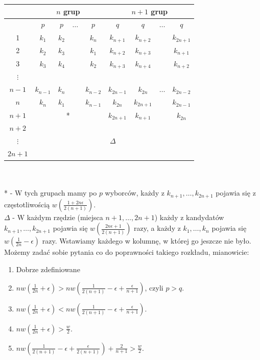 \documentclass[12pt,a4paper]{article}
\theoremstyle{break}
\begin{document}
	\begin{tabular}{|c|cccc|cccc|}\hline
		&\multicolumn{4}{c|}{$n$ grup}&\multicolumn{4}{c|}{$n+1$ grup}\\\hline
		&$p$&$p$&$\dots$&$p$&$q$&$q$&$\dots$&$q$\\\hline
		1&$k_1$&$k_2$&&$k_n$&$k_{n+1}$&$k_{n+2}$&&$k_{2n+1}$\\
		2&$k_2$&$k_3$&&$k_1$&$k_{n+2}$&$k_{n+3}$&&$k_{n+1}$\\
		3&$k_3$&$k_4$&&$k_2$&$k_{n+3}$&$k_{n+4}$&&$k_{n+2}$\\
		
		$\vdots$&&&&&&&&\\
		
		$n-1$&$k_{n-1}$&$k_n$&&$k_{n-2}$&$k_{2n-1}$&$k_{2n}$&$\dots$&$k_{2n-2}$\\
		$n$&$k_n$&$k_1$&&$k_{n-1}$&$k_{2n}$&$k_{2n+1}$&&$k_{2n-1}$\\\hline
		$n+1$&\multicolumn{4}{c|}{*}&$k_{2n+1}$&$k_{n+1}$&&$k_{2n}$\\\hline
		$n+2$&\multicolumn{8}{|c|}{ }\\
		
		$\vdots$&\multicolumn{8}{|c|}{$\Delta$}\\
		
		$2n+1$&\multicolumn{8}{|c|}{ }\\\hline
	\end{tabular}\\\\
	
	 * - W tych grupach mamy po $p$ wyborców, każdy z $k_{n+1}, \dots, k_{2n+1}$ pojawia się z częstotliwością $w\left(\frac{1+2n\epsilon}{2(n+1)}\right)$.\\
	
	$\Delta$ - W każdym rzędzie (miejsca $n+1, \dots, 2n+1$) każdy z kandydatów $k_{n+1}, \dots, k_{2n+1}$ pojawia się $w\left(\frac{2n\epsilon+1}{2(n+1)}\right)$ razy, a każdy z $k_1, \dots, k_n$ pojawia się $w\left(\frac{1}{2n}-\epsilon\right)$ razy. Wstawiamy każdego w kolumnę, w której go jeszcze nie było. \\
	
	Możemy zadać sobie pytania co do poprawności takiego rozkładu, mianowicie:
	
	\begin{enumerate}[1)]
		\item Dobrze zdefiniowane \\
		\item  $nw\left(\frac{1}{2n}+\epsilon\right) > nw\left(\frac{1}{2(n+1)} - \epsilon + \frac{\epsilon}{n+1}\right)$, czyli $p > q$. \\
		\item  $nw\left(\frac{1}{2n}+\epsilon\right) < nw\left(\frac{1}{2(n+1)} - \epsilon + \frac{\epsilon}{n+1}\right)$. \\
		\item  $nw\left(\frac{1}{2n}+\epsilon\right) > \frac{w}{2}$. \\
		\item  $nw\left(\frac{1}{2(n+1)}-\epsilon + \frac{\epsilon}{2(n+1)}\right) + \frac{2}{n+1} > \frac{w}{2}$. \\
	\end{enumerate}
\end{document}
